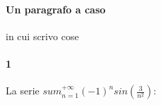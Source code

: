 \documentclass[12pt, a4paper, openany]{book}
\newcommand{\domanda}[2]{\paragraph*{#1} #2:}
\begin{document}
\begin{mybox}
\lipsum[4]
\end{mybox}

\begin{esempio}
\lipsum[1]
\end{esempio}

\paragraph*{Un paragrafo a caso} in cui scrivo cose \lipsum[2]

\domanda{1}{La serie $sum_{n=1}^{+\infty}(-1)^n sin(\frac{3}{n^2})$}
\end{document}
